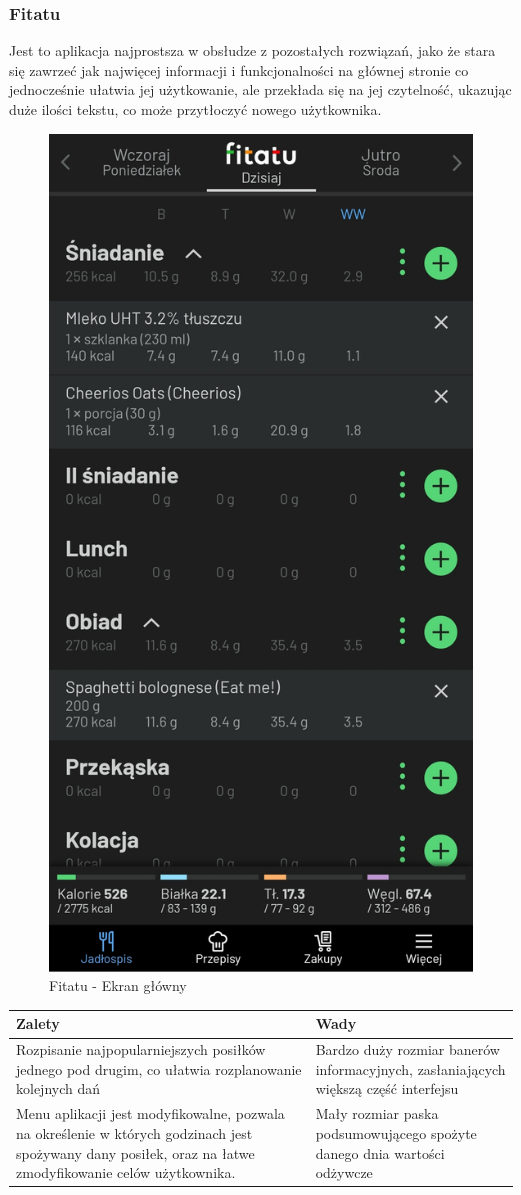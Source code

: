 \documentclass[12pt, a4paper]{article}
\begin{document}
\begin{sloppypar}
{{    \subsubsection{Fitatu}
    {
      Jest to aplikacja najprostsza w obsłudze z pozostałych rozwiązań, jako że stara się
      zawrzeć jak najwięcej informacji i funkcjonalności na głównej stronie co jednocześnie
      ułatwia jej użytkowanie, ale przekłada się na jej czytelność, ukazując duże ilości
      tekstu, co może przytłoczyć nowego użytkownika.
      \begin{figure}[H]
        \centering
        \includegraphics[width=.4\textwidth]{fitatu_pro_1.jpg}
        \caption{Fitatu - Ekran główny}
        \label{fig:fit1}
      \end{figure} 
      \begin{center}
        \begin{tabularx}{ \textwidth } {
          | >{\centering\arraybackslash}X
          | >{\centering\arraybackslash}X
          | }
         \hline
         \bfseries Zalety & \bfseries Wady \\
         \hline
         Rozpisanie najpopularniejszych posiłków jednego pod drugim, co ułatwia
         rozplanowanie kolejnych dań & 
         Bardzo duży rozmiar banerów informacyjnych, zasłaniających większą część
         interfejsu \\
         \hline
         Menu aplikacji jest modyfikowalne, pozwala na określenie w których godzinach
         jest spożywany dany posiłek, oraz na łatwe zmodyfikowanie celów użytkownika. & 
         Mały rozmiar paska podsumowującego spożyte danego dnia wartości odżywcze \\

\end{tabularx}
\end{center}}}}
\end{sloppypar}
\end{document}
